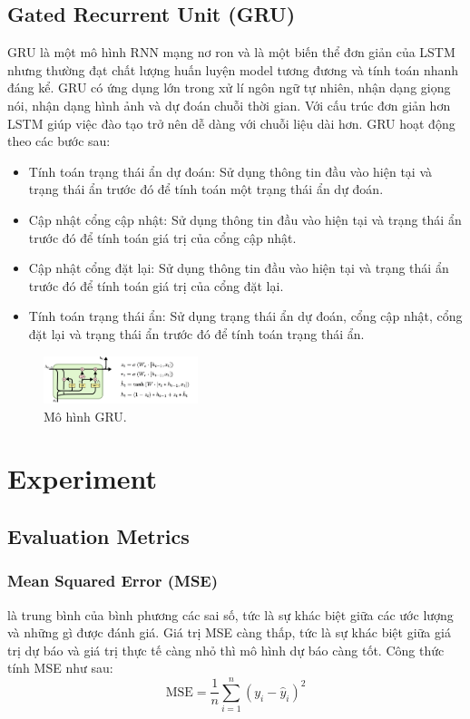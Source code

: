 \documentclass[conference]{IEEEtran}
\begin{document}
\subsection{Gated Recurrent Unit (GRU)}
GRU là một mô hình RNN mạng nơ ron và là một biến thể đơn giản của LSTM nhưng thường đạt chất lượng huấn luyện model tương đương và tính toán nhanh đáng kể. GRU có ứng dụng lớn trong xử lí ngôn ngữ tự nhiên, nhận dạng giọng nói, nhận dạng hình ảnh và dự đoán chuỗi thời gian. Với cấu trúc đơn giản hơn LSTM giúp việc đào tạo trở nên dễ dàng với chuỗi liệu dài hơn. 
GRU hoạt động theo các bước sau:
\begin{itemize}
    \item Tính toán trạng thái ẩn dự đoán: Sử dụng thông tin đầu vào hiện tại và trạng thái ẩn trước đó để tính toán một trạng thái ẩn dự đoán.
    \item Cập nhật cổng cập nhật: Sử dụng thông tin đầu vào hiện tại và trạng thái ẩn trước đó để tính toán giá trị của cổng cập nhật.
    \item Cập nhật cổng đặt lại: Sử dụng thông tin đầu vào hiện tại và trạng thái ẩn trước đó để tính toán giá trị của cổng đặt lại.
    \item Tính toán trạng thái ẩn: Sử dụng trạng thái ẩn dự đoán, cổng cập nhật, cổng đặt lại và trạng thái ẩn trước đó để tính toán trạng thái ẩn.
\end{itemize}
\begin{figure}[H]
    \centering
    \includegraphics[width=0.4\textwidth]{bibliography/pictures/GRU.png}
    \caption{Mô hình GRU.}
\end{figure}
\section{Experiment}
\subsection{Evaluation Metrics} 
\subsubsection{Mean Squared Error (MSE)} là trung bình của bình phương các sai số, tức là sự khác biệt giữa các ước lượng và những gì được đánh giá. Giá trị MSE càng thấp, tức là sự khác biệt giữa giá trị dự báo và giá trị thực tế càng nhỏ thì mô hình dự báo càng tốt. Công thức tính MSE như sau:
\[
\text{MSE} = \frac{1}{n} \sum_{i=1}^{n} (y_i - \hat{y}_i)^2
\]
\end{document}
